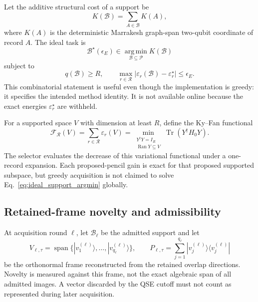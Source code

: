 \documentclass[
  reprint,
  amsmath,
  amssymb,
  aps,
  pra,
  nofootinbib,
  superscriptaddress,
  floatfix
]{revtex4-2}
\newcommand{\ket}[1]{|#1\rangle}
\newcommand{\bra}[1]{\langle #1|}
\newcommand{\Tr}{\operatorname{Tr}}
\newcommand{\spanop}{\operatorname{span}}
\newcommand{\argmin}{\operatorname*{arg\,min}}
\newcommand{\mathcalR}{\mathcal{R}}
\begin{document}
Let the additive structural cost of a support be
\begin{equation}
 K(\mathcal B)=\sum_{A\in\mathcal B}K(A),
 \label{eq:support_cost}
\end{equation}
where $K(A)$ is the deterministic Marrakesh graph-span two-qubit coordinate
of record $A$.  The ideal task is
\begin{equation}
 \mathcal B^\star(\epsilon_E)\in
 \argmin_{\mathcal B\subseteq\mathcal P}K(\mathcal B)
 \label{eq:ideal_support_argmin}
\end{equation}
subject to
\begin{equation}
 q(\mathcal B)\geq R,
 \qquad
 \max_{r\in\mathcalR}
 |\varepsilon_r(\mathcal B)-\varepsilon_r^\star|\leq\epsilon_E.
 \label{eq:ideal_support_constraints}
\end{equation}
This combinatorial statement is useful even though the implementation is
greedy: it specifies the intended method identity.  It is not available
online because the exact energies $\varepsilon_r^\star$ are withheld.

For a supported space $V$ with dimension at least $R$, define the Ky--Fan
functional
\begin{equation}
 \mathcal F_{\mathcalR}(V)
 =\sum_{r\in\mathcalR}\varepsilon_r(V)
 =\min_{\substack{Y^\dagger Y=I_R\\\operatorname{Ran}Y\subseteq V}}
 \Tr(Y^\dagger H_0Y).
 \label{eq:ky_fan_variational}
\end{equation}
The selector evaluates the decrease of this variational functional under a
one-record expansion.  Each proposed-pencil gain is exact for that proposed
supported subspace, but greedy acquisition is not claimed to solve
Eq.~\eqref{eq:ideal_support_argmin} globally.

\subsection{Retained-frame novelty and admissibility}
\label{sec:retained_novelty}

At acquisition round $\ell$, let $\mathcal B_\ell$ be the admitted support
and let
\begin{equation}
 V_{\ell,\tau}
 =\spanop\{\ket{v_1^{(\ell)}},\ldots,\ket{v_{q_\ell}^{(\ell)}}\},
 \qquad
 P_{\ell,\tau}=\sum_{j=1}^{q_\ell}
 \ket{v_j^{(\ell)}}\!\bra{v_j^{(\ell)}}
 \label{eq:retained_frame}
\end{equation}
be the orthonormal frame reconstructed from the retained overlap directions.
Novelty is measured against this frame, not the exact algebraic span of all
admitted images.  A vector discarded by the QSE cutoff must not count as
represented during later acquisition.
\end{document}
